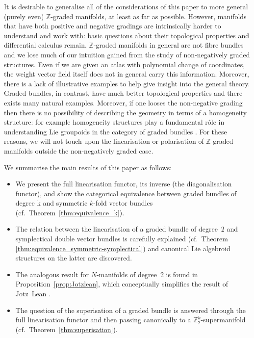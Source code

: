 \documentclass[10pt,a4paper]{amsart}
\numberwithin{equation}{section}
\begin{document}
It is desirable to generalise all of the considerations of this paper to more general (purely even) $\mathbb{Z}$-graded manifolds, at least as far as possible. However, manifolds that have both positive and negative gradings are intrinsically harder to understand and work with: basic questions about their topological properties and dif\/ferential calculus remain. $\mathbb{Z}$-graded manifolds in general are not f\/ibre bundles and we lose much of our intuition gained from the study of non-negatively graded structures. Even if we are given an atlas with polynomial change of coordinates, the weight vector f\/ield itself does not in general carry this information. Moreover, there is a lack of illustrative examples to help give insight into the general theory. Graded bundles, in contrast, have much better topological properties and there exists many natural examples. Moreover, if one looses the non-negative grading then there is no possibility of describing the geometry in terms of a homogeneity structure: for example homogeneity structures play a fundamental r\^ole in understanding Lie groupoids in the category of graded bundles \cite{Bruce:2014c}. For these reasons, we will not touch upon the linearisation or polarisation of $\mathbb{Z}$-graded manifolds outside the non-negatively graded case.

We summarise the main results of this paper as follows:
\begin{itemize}\itemsep=0pt
\item We present the full linearisation functor, its inverse (the diagonalisation functor), and show the categorical equivalence between graded bundles of degree k and symmetric $k$-fold vector bundles (cf.~Theorem~\ref{thm:equivalence_k}).
\item The relation between the linearisation of a graded bundle of degree~2 and symplectical double vector bundles is carefully explained (cf.~Theorem \ref{thm:equivalence_symmetric-symplectical}) and canonical Lie algebroid structures on the latter are discovered.
\item The analogous result for $N$-manifolds of degree~2 is found in Proposition~\ref{prop:Jotzlean}, which conceptually simplif\/ies the result of Jotz~Lean \cite[Theorem~3.17]{JotzLean:2015}.
\item The question of the superisation of a graded bundle is answered through the full linearisation functor and then passing canonically to a $\mathbb{Z}_{2}^{k}$-supermanifold (cf.~Theorem~\ref{thm:superisation}).
\end{itemize}
\end{document}
